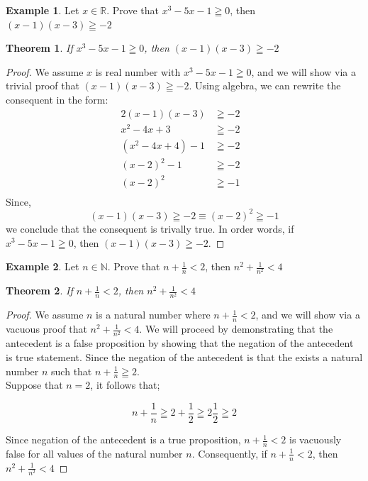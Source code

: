 \documentclass{book}
\newtheorem{theorem}{Theorem}[section]
\theoremstyle{definition}
\newtheorem{example}{Example}[definition]
\theoremstyle{remark}
\newcommand{\bb}[1]{\mathbb{#1}}
\begin{document}
\begin{example}
Let $x \in \bb{R}$. Prove that $x^3 -5x - 1 \geqq 0$, then $(x-1)(x-3)\geqq -2$

\begin{tcolorbox}
	\begin{theorem}
		If $x^3 -5x - 1 \geqq 0$, then $(x-1)(x-3)\geqq -2$
	\end{theorem}
\end{tcolorbox}

\begin{proof}
We assume $x$ is real number with $x^3 -5x - 1 \geqq 0$, and we will show via a trivial proof that $(x-1)(x-3)\geqq -2$. Using algebra, we can rewrite the consequent in the form: 
\begin{alignat*}{2}
 	(x-1)(x-3) 			& \geqq -2 & \\
 	x^2 -4x + 3  		& \geqq -2\\
 	(x^2 -4x + 4) - 1 	& \geqq -2& \\
 	(x-2)^2 -1			& \geqq -2& \\
 	(x-2)^2				& \geqq -1& \\
\end{alignat*}
Since, 
	\begin{equation}
		(x-1)(x-3) \geqq -2 \equiv (x-2)^2 \geqq -1  \nonumber 
	\end{equation}
we conclude that the consequent is trivally true. In order words, if $x^3 -5x - 1 \geqq 0$, then $(x-1)(x-3)\geqq -2$. 
\end{proof}
\end{example}



\begin{example}
Let $n \in \bb{N}$. Prove that $n + \frac{1}{n} < 2$, then $n^2 + \frac{1}{n^2} < 4$

\begin{tcolorbox}
	\begin{theorem}
		If $n + \frac{1}{n} < 2$, then $n^2 + \frac{1}{n^2} < 4$
	\end{theorem}
\end{tcolorbox}

\begin{proof}
We assume $n$ is a natural number where $n + \frac{1}{n} < 2$, and we will show via a vacuous proof that $n^2 + \frac{1}{n^2} < 4$. We will proceed by demonstrating that the antecedent is a false proposition by showing that the negation of the antecedent is true statement. Since the negation of the antecedent is that the exists a natural number $n$ such that $n + \frac{1}{n} \geqq 2$. \\ 
Suppose that $n = 2$, it follows that; 

	\begin{equation}
		n + \frac{1}{n} \geqq 2 + \frac{1}{2} \geqq 2\frac{1}{2} \geqq 2 \nonumber 
	\end{equation}

Since negation of the antecedent is a true proposition, $n + \frac{1}{n} < 2$ is vacuously false for all values of the natural number $n$. Consequently, if $n + \frac{1}{n} < 2$, then $n^2 + \frac{1}{n^2} < 4$
\end{proof}
\end{example}
\end{document}
